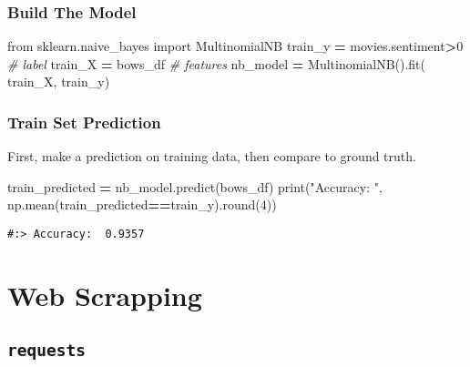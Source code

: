 \documentclass[
]{book}
\newenvironment{Shaded}{\begin{snugshade}}{\end{snugshade}}
\newcommand{\BuiltInTok}[1]{#1}
\newcommand{\CommentTok}[1]{\textcolor[rgb]{0.37,0.37,0.37}{\textit{#1}}}
\newcommand{\DecValTok}[1]{\textcolor[rgb]{0.06,0.06,0.06}{#1}}
\newcommand{\ImportTok}[1]{#1}
\newcommand{\NormalTok}[1]{#1}
\newcommand{\OperatorTok}[1]{\textcolor[rgb]{0.43,0.43,0.43}{\textbf{#1}}}
\newcommand{\StringTok}[1]{\textcolor[rgb]{0.5,0.5,0.5}{#1}}
\begin{document}
\hypertarget{build-the-model}{%
\subsection{Build The Model}\label{build-the-model}}

\begin{Shaded}
\begin{Highlighting}[]
\ImportTok{from}\NormalTok{ sklearn.naive\_bayes }\ImportTok{import}\NormalTok{ MultinomialNB}
\NormalTok{train\_y  }\OperatorTok{=}\NormalTok{ movies.sentiment}\OperatorTok{\textgreater{}}\DecValTok{0}   \CommentTok{\# label}
\NormalTok{train\_X  }\OperatorTok{=}\NormalTok{ bows\_df              }\CommentTok{\# features}
\NormalTok{nb\_model }\OperatorTok{=}\NormalTok{ MultinomialNB().fit( train\_X, train\_y)}
\end{Highlighting}
\end{Shaded}

\hypertarget{train-set-prediction}{%
\subsection{Train Set Prediction}\label{train-set-prediction}}

First, make a prediction on training data, then compare to ground truth.

\begin{Shaded}
\begin{Highlighting}[]
\NormalTok{train\_predicted }\OperatorTok{=}\NormalTok{ nb\_model.predict(bows\_df)}
\BuiltInTok{print}\NormalTok{(}\StringTok{"Accuracy: "}\NormalTok{, np.mean(train\_predicted}\OperatorTok{==}\NormalTok{train\_y).}\BuiltInTok{round}\NormalTok{(}\DecValTok{4}\NormalTok{))}
\end{Highlighting}
\end{Shaded}

\begin{verbatim}
#:> Accuracy:  0.9357
\end{verbatim}

\hypertarget{web-scrapping}{%
\chapter{Web Scrapping}\label{web-scrapping}}

\hypertarget{requests}{%
\section{\texorpdfstring{\texttt{requests}}{requests}}\label{requests}}
\end{document}
